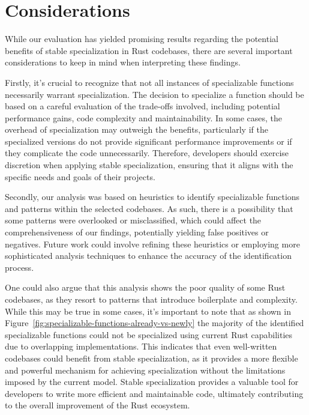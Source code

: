 
\section{Considerations}\label{sec:evaluation-considerations}
While our evaluation has yielded promising results regarding the potential benefits of stable specialization in Rust codebases, there are several important considerations to keep in mind when interpreting these findings.

Firstly, it's crucial to recognize that not all instances of specializable functions necessarily warrant specialization.
The decision to specialize a function should be based on a careful evaluation of the trade-offs involved, including potential performance gains, code complexity and maintainability.
In some cases, the overhead of specialization may outweigh the benefits, particularly if the specialized versions do not provide significant performance improvements or if they complicate the code unnecessarily.
Therefore, developers should exercise discretion when applying stable specialization, ensuring that it aligns with the specific needs and goals of their projects.

Secondly, our analysis was based on heuristics to identify specializable functions and patterns within the selected codebases.
As such, there is a possibility that some patterns were overlooked or misclassified, which could affect the comprehensiveness of our findings, potentially yielding false positives or negatives.
Future work could involve refining these heuristics or employing more sophisticated analysis techniques to enhance the accuracy of the identification process.

One could also argue that this analysis shows the poor quality of some Rust codebases, as they resort to patterns that introduce boilerplate and complexity.
While this may be true in some cases, it's important to note that as shown in Figure~\ref{fig:specializable-functions-already-vs-newly} the majority of the identified specializable functions could not be specialized using current Rust capabilities due to overlapping implementations.
This indicates that even well-written codebases could benefit from stable specialization, as it provides a more flexible and powerful mechanism for achieving specialization without the limitations imposed by the current model.
Stable specialization provides a valuable tool for developers to write more efficient and maintainable code, ultimately contributing to the overall improvement of the Rust ecosystem.

